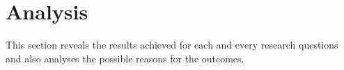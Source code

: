 \documentclass[a4paper, 11pt]{article}
\begin{document}







\pagebreak
\section{Analysis}

This section reveals the results achieved for each and every research questions and also analyses the possible reasons for the outcomes.
\end{document}
